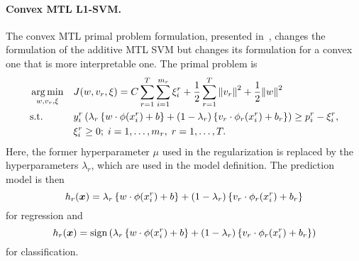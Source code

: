 \paragraph*{{Convex} MTL L1-SVM.\\}
The {convex} MTL primal problem formulation, presented in~\cite{RuizAD19}, changes the formulation of the {additive} MTL SVM but changes its formulation for a convex one that is more interpretable one. The primal problem is
\begin{equation}\label{eq:svmmtl_primal_convex}
    \begin{aligned}
    & \argmin_{w, {v}_r, \xi}
    & & {J({w}, {v}_r, \xi) = C \sum_{r= 1}^T \sum_{i=1}^{m_r} {\xi_{i}^r} + \frac{1}{2} \sum_{r= 1}^T{\norm{{v}_r}^2} + \frac{1}{2} {\norm{{w}}}^2} \\
    & \text{s.t.}
    & & y_{i}^r \left(\lambda_r \left\lbrace {w} \cdot \phi(x_{i}^r) + b  \right\rbrace + (1 - \lambda_r) \left\lbrace {v}_r \cdot \phi_r(x_{i}^r) + b_r \right\rbrace  \right) \geq p_{i}^r - \xi_{i}^r ,  \\
    & & & \xi_{i}^r \geq 0; \;  i=1 , \dotsc , m_r, \;  r= 1,\dotsc, T  . \\
    \end{aligned}
\end{equation}
Here, the former hyperparameter $\mu$ used in the regularization is replaced by the hyperparameters $\lambda_r$, which are used in the model definition. The prediction model is then
\begin{equation}
    \nonumber
    h_r(\bm{x}) = \lambda_r \left\lbrace {w} \cdot \phi(x_{i}^r) + b  \right\rbrace + (1 - \lambda_r) \left\lbrace {v}_r \cdot \phi_r(x_{i}^r) + b_r \right\rbrace
\end{equation}
for regression and 
\begin{equation}
    \nonumber
    h_r(\bm{x}) = \operatorname{sign}{ \left(\lambda_r \left\lbrace {w} \cdot \phi(x_{i}^r) + b  \right\rbrace + (1 - \lambda_r) \left\lbrace {v}_r \cdot \phi_r(x_{i}^r) + b_r \right\rbrace \right)}
\end{equation}
for classification.
%

